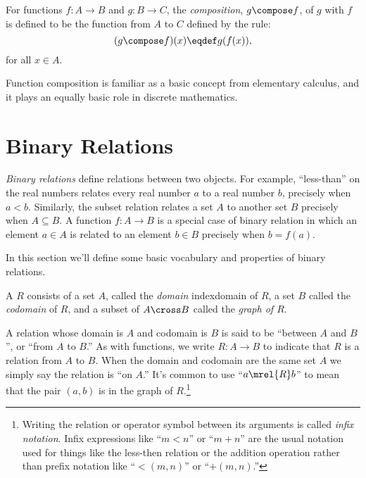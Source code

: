 \begin{definition}\label{func_compose_def}
  For functions $f:A \to B$ and $g:B \to C$, the \emph{composition},
  $g \compose f$, of $g$ with $f$ is defined to be the function
  from $A$ to $C$ defined by the rule:
\begin{displaymath}
(g \compose f)(x) \eqdef g(f(x)),
\end{displaymath}
for all $x \in A$.
\end{definition}

Function composition is familiar as a basic concept from elementary
calculus, and it plays an equally basic role in discrete mathematics.

\section{Binary Relations}\label{rel_sec}

\emph{Binary relations} define relations between two objects.  For
example, ``less-than'' on the real numbers relates every real number $a$
to a real number $b$, precisely when $a < b$.  Similarly, the subset
relation relates a set $A$ to another set $B$ precisely when $A
\subseteq B$.  A function $f:A \to B$ is a special case of binary relation
in which an element $a \in A$ is related to an element $b \in B$ precisely
when $b = f(a)$.

In this section we'll define some basic vocabulary and properties of binary
relations.

\begin{definition}\label{reldef}
A %
$R$ consists of a set $A$, called the
\emph{domain}%
index{domain} 
of $R$, a set $B$ called the
\emph{codomain}%
of $R$, and a subset of $A \cross B$ called the
\emph{graph of $R$}.
\end{definition}

A relation whose domain is $A$ and codomain is $B$ is said to be
``between $A$ and $B$'', or ``from $A$ to $B$.''  As with functions,
we write $R: A \to B$ to indicate that $R$ is a relation from $A$ to
$B$.  When the domain and codomain are the same set $A$ we simply
say the%
%
relation is ``on $A$.''  It's common
to use ``$a \mrel{R} b$'' to mean that the pair $(a,b)$ is in the
graph of $R$.\footnote{Writing the relation or operator symbol between
  its arguments is called \emph{infix notation}.  Infix expressions
  like ``$m < n$'' or ``$m + n$'' are the usual notation used for
  things like the less-then relation or the addition operation rather
  than {prefix notation} like ``$<(m,n)$'' or ``$+(m,n)$.''}

